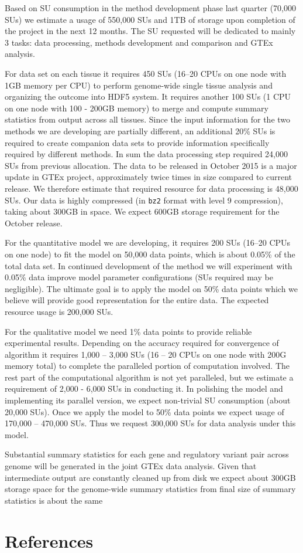 \documentclass[10pt]{article}
\begin{document}
Based on SU consumption in the method development phase last quarter (70,000 SUs) we estimate a usage of 550,000 SUs and 1TB of storage upon completion of the project in the next 12 months. 
The SU requested will be dedicated to mainly 3 tasks: data processing, methods development and comparison and GTEx analysis.

For data set on each tissue it requires 450 SUs (16--20 CPUs on one node with 1GB memory per CPU) to perform genome-wide single tissue analysis and organizing the outcome into HDF5 system. 
It requires another 100 SUs (1 CPU on one node with 100 - 200GB memory) to merge and compute summary statistics from output across all tissues. 
Since the input information for the two methods we are developing are partially different, an additional 20\% SUs is required to create companion data sets to provide information specifically required by different methods. 
In sum the data processing step required 24,000 SUs from previous allocation. The data to be released in October 2015 is a major update in GTEx project, approximately twice times in size compared to current release. 
We therefore estimate that required resource for data processing is 48,000 SUs. 
Our data is highly compressed (in \texttt{bz2} format with level 9 compression), taking about 300GB in space. We expect 600GB storage requirement for the October release.

For the quantitative model we are developing, it requires 200 SUs (16--20 CPUs on one node) to fit the model on 50,000 data points, which is about 0.05\% of the total data set. 
In continued development of the method we will experiment with 0.05\% data improve model parameter configurations (SUs required may be negligible). 
The ultimate goal is to apply the model on 50\% data points which we believe will provide good representation for the entire data. 
The expected resource usage is 200,000 SUs.

For the qualitative model we need 1\% data points to provide reliable experimental results.
Depending on the accuracy required for convergence of algorithm it requires 1,000 -- 3,000 SUs 
(16 -- 20 CPUs on one node with 200G memory total) to complete the paralleled portion
of computation involved. The rest part of the computational algorithm is not yet
paralleled, but we estimate a requirement of 2,000 - 6,000 SUs in conducting it. In polishing
the model and implementing its parallel version, we expect non-trivial SU consumption (about 20,000 SUs). Once we apply the model to 50\% data points we expect usage of 170,000 -- 470,000 SUs. Thus we request 300,000 SUs for data analysis under this model.

Substantial summary statistics for each gene and regulatory variant pair across genome will be generated in the joint GTEx data analysis. 
Given that intermediate output are constantly cleaned up from disk we expect about 300GB storage space for the genome-wide summary statistics from final size of summary statistics is about the same 

\section*{References}\label{references}
\end{document}
